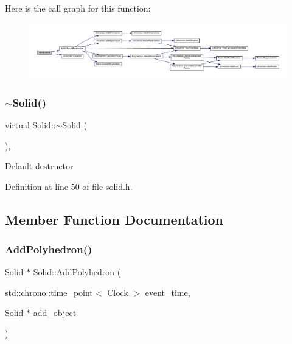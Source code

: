 Here is the call graph for this function\+:\nopagebreak
\begin{figure}[H]
\begin{center}
\leavevmode
\includegraphics[width=350pt]{class_solid_a80746ad255dded6090e648fc3f0dbd93_cgraph}
\end{center}
\end{figure}
\mbox{\label{class_solid_a07095e0808c0ef6b206bc70992ef557d}} 
\subsubsection{\texorpdfstring{$\sim$\+Solid()}{~Solid()}}
{\footnotesize\ttfamily virtual Solid\+::$\sim$\+Solid (\begin{DoxyParamCaption}{ }\end{DoxyParamCaption})\hspace{0.3cm}{\ttfamily [inline]}, {\ttfamily [virtual]}}

Default destructor 

Definition at line 50 of file solid.\+h.



\subsection{Member Function Documentation}
\mbox{\label{class_solid_a87a3b588f931ff20f09a5d46f6cb7907}} 
\subsubsection{\texorpdfstring{Add\+Polyhedron()}{AddPolyhedron()}}
{\footnotesize\ttfamily \mbox{\hyperlink{class_solid}{Solid}} $\ast$ Solid\+::\+Add\+Polyhedron (\begin{DoxyParamCaption}\item[{std\+::chrono\+::time\+\_\+point$<$ \mbox{\hyperlink{universe_8h_a0ef8d951d1ca5ab3cfaf7ab4c7a6fd80}{Clock}} $>$}]{event\+\_\+time,  }\item[{\mbox{\hyperlink{class_solid}{Solid}} $\ast$}]{add\+\_\+object }\end{DoxyParamCaption})}



